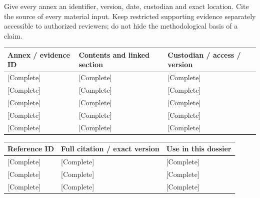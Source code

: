 \begin{Notice}Give every annex an identifier, version, date, custodian and exact location. Cite the source of every material input. Keep restricted supporting evidence separately accessible to authorized reviewers; do not hide the methodological basis of a claim.\end{Notice}
{\sffamily\fontsize{8.3}{10.3}\selectfont\begin{longtable}{@{}P{39.59mm} P{75.89mm} P{49.49mm}@{}}
\toprule
\textbf{Annex / evidence ID} & \textbf{Contents and linked section} & \textbf{Custodian / access / version}\\\midrule\endhead
\rule{0pt}{7.7mm}[Complete] & [Complete] & [Complete]\\\hline
\rule{0pt}{7.7mm}[Complete] & [Complete] & [Complete]\\\hline
\rule{0pt}{7.7mm}[Complete] & [Complete] & [Complete]\\\hline
\rule{0pt}{7.7mm}[Complete] & [Complete] & [Complete]\\\hline
\rule{0pt}{7.7mm}[Complete] & [Complete] & [Complete]\\\hline
\end{longtable}}
{\sffamily\fontsize{8.3}{10.3}\selectfont\begin{longtable}{@{}P{29.69mm} P{82.48mm} P{52.79mm}@{}}
\toprule
\textbf{Reference ID} & \textbf{Full citation / exact version} & \textbf{Use in this dossier}\\\midrule\endhead
\rule{0pt}{7.7mm}[Complete] & [Complete] & [Complete]\\\hline
\rule{0pt}{7.7mm}[Complete] & [Complete] & [Complete]\\\hline
\rule{0pt}{7.7mm}[Complete] & [Complete] & [Complete]\\\hline
\end{longtable}}
